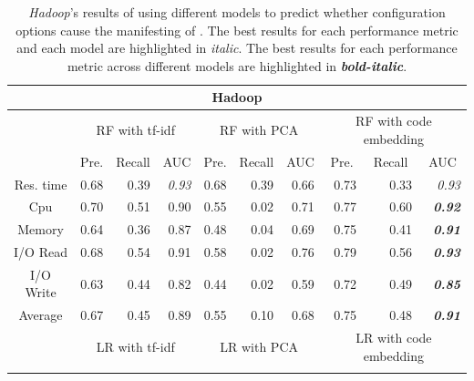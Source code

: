\documentclass[10pt,journal,compsoc]{IEEEtran}
\begin{document}
\begin{table}
\centering
\caption{\emph{Hadoop}'s results of using different models to predict whether configuration options cause the manifesting of \inconsistent. The best results for each performance metric and each model are highlighted in \textit{italic}. The best results for each performance metric across different models are highlighted in \textbf{\textit{bold-italic}}.} %

\begin{tabular}{|c|r|r|r|r|r|r|r|r|r|}
\hline
\multicolumn{10}{|c|}{Hadoop}    \\ \hline
\multirow{2}{*}{} & \multicolumn{3}{c|}{RF with tf-idf}        & \multicolumn{3}{c|}{RF with PCA}           & \multicolumn{3}{c|}{RF with code embedding}\\ \cline{2-10} 
                  & \multicolumn{1}{c|}{Pre.} & \multicolumn{1}{c|}{Recall} & \multicolumn{1}{c|}{AUC} & \multicolumn{1}{c|}{Pre.} & \multicolumn{1}{c|}{Recall} & \multicolumn{1}{c|}{AUC} & \multicolumn{1}{c|}{Pre.} & \multicolumn{1}{c|}{Recall} & \multicolumn{1}{c|}{AUC} \\ \hline
Res. time         & 0.68  & 0.39    & \textit{0.93}            & 0.68  & 0.39    & 0.66 & 0.73  & 0.33    & \textit{0.93}            \\ \hline
Cpu               & 0.70  & 0.51    & 0.90 & 0.55  & 0.02    & 0.71 & 0.77  & 0.60    & \textit{\textbf{0.92}}   \\ \hline
Memory            & 0.64  & 0.36    & 0.87 & 0.48  & 0.04    & 0.69 & 0.75  & 0.41    & \textit{\textbf{0.91}}   \\ \hline
I/O Read          & 0.68  & 0.54    & 0.91 & 0.58  & 0.02    & 0.76 & 0.79  & 0.56    & \textit{\textbf{0.93}}   \\ \hline
I/O Write         & 0.63  & 0.44    & 0.82 & 0.44  & 0.02    & 0.59 & 0.72  & 0.49    & \textit{\textbf{0.85}}   \\ \hline
Average           & 0.67  & 0.45    & 0.89 & 0.55  & 0.10    & 0.68 & 0.75  & 0.48    & \textit{\textbf{0.91}}   \\ \hline
\multirow{2}{*}{} & \multicolumn{3}{c|}{LR with tf-idf}        & \multicolumn{3}{c|}{LR with PCA}           & \multicolumn{3}{c|}{LR with code embedding}\\ \cline{2-10} 

\end{tabular}
\end{table}
\end{document}
